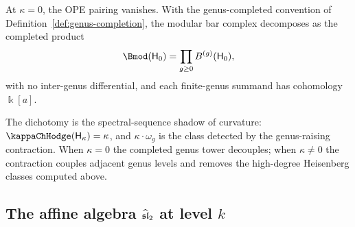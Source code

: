 \begin{computation}
At $\kappa = 0$, the OPE pairing vanishes. With the genus-completed
convention of Definition~\ref{def:genus-completion}, the modular bar
complex decomposes as the completed product
\[
 \Bmod(\Heis_0)=\prod_{g\geq 0} B^{(g)}(\Heis_0),
\]
with no inter-genus differential, and each finite-genus summand has
cohomology $\Bbbk[a]$.

The dichotomy is the spectral-sequence shadow of curvature:
$\kappaChHodge(\Heis_\kappa) = \kappa$, and $\kappa \cdot \omega_g$
is the class detected by the genus-raising contraction. When
$\kappa = 0$ the completed genus tower decouples; when
$\kappa \neq 0$ the contraction couples adjacent genus levels and
removes the high-degree Heisenberg classes computed above.
\end{computation}


\subsection{The affine algebra $\widehat{\mathfrak{sl}}_2$ at level $k$}
\label{subsec:example-sl2}

